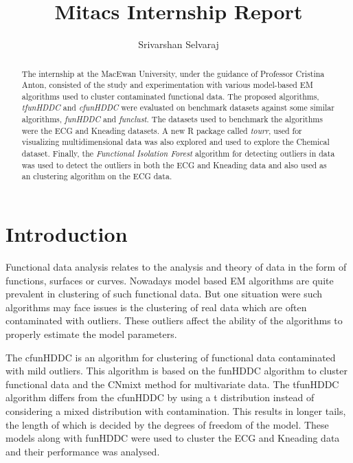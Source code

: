 \documentclass[]{article}
\title{Mitacs Internship Report}
\author{Srivarshan Selvaraj}
\begin{document}
\maketitle



\begin{abstract}
The internship at the MacEwan University, under the guidance of Professor Cristina Anton, consisted of the study and experimentation with various model-based EM algorithms used to cluster contaminated functional data. The proposed algorithms, \emph{tfunHDDC} and \emph{cfunHDDC} were evaluated on benchmark datasets against some similar algorithms, \emph{funHDDC} and \emph{funclust}. The datasets used to benchmark the algorithms were the ECG and Kneading datasets. A new R package called \emph{tourr}, used for visualizing multidimensional data was also explored and used to explore the Chemical dataset. Finally, the \emph{Functional Isolation Forest} algorithm for detecting outliers in data was used to detect the outliers in both the ECG and Kneading data and also used as an clustering algorithm on the ECG data.
\end{abstract}



\section{Introduction}

Functional data analysis relates to the analysis and theory of data in the form of functions, surfaces or curves. Nowadays model based EM algorithms are quite prevalent in clustering of such functional data. But one situation were such algorithms may face issues is the clustering of real data which are often contaminated with outliers. These outliers affect the ability of the algorithms to properly estimate the model parameters. 

The cfunHDDC is an algorithm for clustering of functional data contaminated with mild outliers. This algorithm is based on the funHDDC algorithm to cluster functional data and the CNmixt method for multivariate data. The tfunHDDC algorithm differs from the cfunHDDC by using a t distribution instead of considering a mixed distribution with contamination. This results in longer tails, the length of which is decided by the degrees of freedom of the model. These models along with funHDDC were used to cluster the ECG and Kneading data and their performance was analysed.
\end{document}
